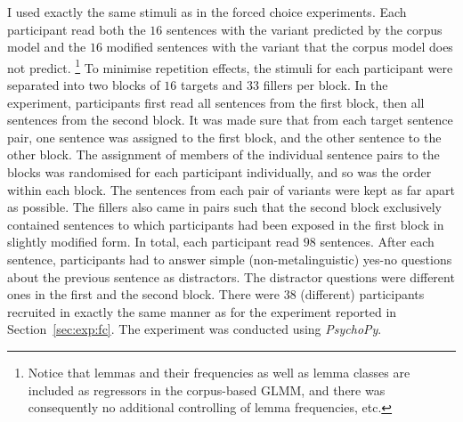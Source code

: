 \documentclass[USenglish]{article}
\begin{document}
I used exactly the same stimuli as in the forced choice experiments.
Each participant read both the $16$ sentences with the variant predicted by the corpus model and the $16$ modified sentences with the variant that the corpus model does not predict.%
\footnote{Notice that lemmas and their frequencies as well as lemma classes are included as regressors in the corpus-based GLMM, and there was consequently no additional controlling of lemma frequencies, etc.}
To minimise repetition effects, the stimuli for each participant were separated into two blocks of $16$ targets and $33$ fillers per block.
In the experiment, participants first read all sentences from the first block, then all sentences from the second block.
It was made sure that from each target sentence pair, one sentence was assigned to the first block, and the other sentence to the other block.
The assignment of members of the individual sentence pairs to the blocks was randomised for each participant individually, and so was the order within each block.
The sentences from each pair of variants were kept as far apart as possible.
The fillers also came in pairs such that the second block exclusively contained sentences to which participants had been exposed in the first block in slightly modified form.
In total, each participant read $98$ sentences.
After each sentence, participants had to answer simple (non-metalinguistic) yes-no questions about the previous sentence as distractors.
The distractor questions were different ones in the first and the second block.
There were $38$ (different) participants recruited in exactly the same manner as for the experiment reported in Section~\ref{sec:exp:fc}.
The experiment was conducted using \textit{PsychoPy}.
\end{document}
